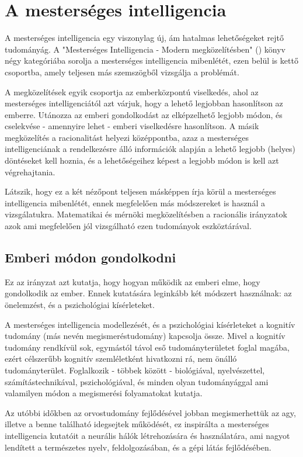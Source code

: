 \label{Chap:tema}

\section {A mesterséges intelligencia}
A mesterséges intelligencia egy viszonylag új, ám hatalmas lehetőségeket rejtő tudományág. A "Mesterséges Intelligencia - Modern megközelítésben" (\cite{bibref:mi_modern}) könyv négy kategóriába sorolja a mesterséges intelligencia mibenlétét, ezen belül is kettő csoportba, amely teljesen más szemszögből vizsgálja a problémát.\ujsor

A megközelítések egyik csoportja az emberközpontú viselkedés, ahol az mesterséges intelligenciától azt várjuk, hogy a lehető legjobban hasonlítson az emberre. Utánozza az emberi gondolkodást az elképzelhető legjobb módon, és cselekvése - amennyire lehet - emberi viselkedésre hasonlítson. A másik megközelítés a racionalitást helyezi középpontba, azaz a mesterséges intelligenciának a rendelkezésre álló információk alapján a lehető legjobb (helyes) döntéseket kell hoznia, és a lehetőségeihez képest a legjobb módon is kell azt végrehajtania. \ujsor

Látszik, hogy ez a két nézőpont teljesen másképpen írja körül a mesterséges intelligencia mibenlétét, ennek megfelelően más módszereket is használ a vizsgálatukra. Matematikai és mérnöki megközelítésben a racionális irányzatok azok ami megfelelően jól vizsgálható ezen tudományok eszköztárával.\ujsor

\subsection{Emberi módon gondolkodni}
Ez az irányzat azt kutatja, hogy hogyan működik az emberi elme, hogy gondolkodik az ember. Ennek kutatására leginkább két módszert használnak: az önelemzést, és a pszichológiai kísérleteket.\ujsor

A mesterséges intelligencia modellezését, és a pszichológiai kísérleteket a kognitív tudomány (más nevén megismeréstudomány) kapcsolja össze. Mivel a kognitív tudomány rendkívül sok, egymástól távol eső tudományterületet foglal magába, ezért célszerűbb kognitív szemléletként hivatkozni rá, nem önálló tudományterület. Foglalkozik - többek között - biológiával, nyelvészettel, számítástechnikával, pszichológiával, és minden olyan tudományággal ami valamilyen módon a megismerési folyamatokat kutatja.\ujsor

Az utóbbi időkben az orvostudomány fejlődésével jobban megismerhettük az agy, illetve a benne található idegsejtek működését, ez inspirálta a mesterséges intelligencia kutatóit a neurális hálók létrehozására és használatára, ami nagyot lendített a természetes nyelv, feldolgozásában, és a gépi látás fejlődésében.

